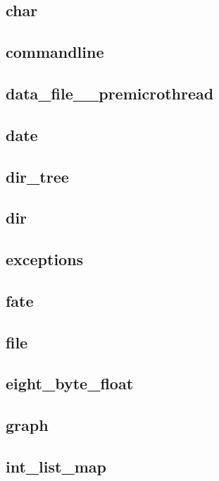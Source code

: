 \subsection{char}						
\subsection{commandline}					
\subsection{data\_file\_\_premicrothread}			
\subsection{date}						
\subsection{dir\_tree}						
\subsection{dir}						
\subsection{exceptions}						
\subsection{fate}						
\subsection{file}						
\subsection{eight\_byte\_float}					
\subsection{graph}						
\subsection{int\_list\_map}					

